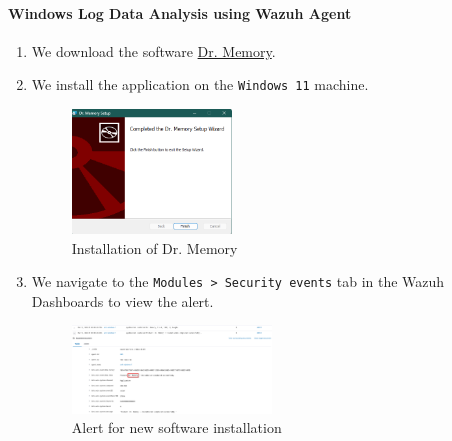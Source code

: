 \paragraph{Windows Log Data Analysis using Wazuh Agent}
\begin{enumerate}
    \item We download the software \href{https://drmemory.org}{Dr. Memory}.
    \item We install the application on the \texttt{Windows 11} machine.
    \begin{figure} [H]
    \centering
    \includegraphics[width=0.4\textwidth]{images/log-data/11.png}
    \caption{Installation of Dr. Memory}
    \end{figure}
    \item We navigate to the \texttt{Modules > Security events} tab in the Wazuh Dashboards to view the alert. 
    \begin{figure} [H]
    \centering
    \includegraphics[width=0.5\textwidth]{images/log-data/12.png}
    \caption{Alert for new software installation}
    \end{figure}
\end{enumerate}
